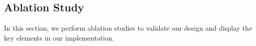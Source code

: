 \documentclass{article}
\begin{document}
	\subsection{Ablation Study}
	\label{sec4.5}
	In this section, we perform ablation studies to validate our design and display the key elements in our implementation.
	\begin{table}[t]
		\centering
        	\vspace{-0.5ex}
		\caption{Comparison of the pure prototype learner and the generation-based ZLA prototype learner. {\bf Non Gen.:} a latest proposed pure prototype learner, implemented by the official code (with the post-hoc correction removed for a fair comparison). {\bf Gen.:} WGAN-based zero-shot logit adjustment prototype learner.}
        	\vspace{-0.5ex}
		\label{tab3}
	\end{table}
    
\end{document}
